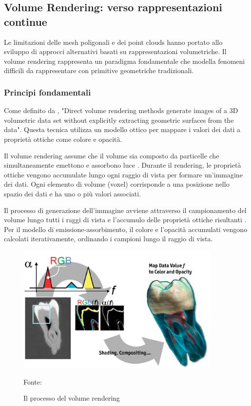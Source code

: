 \subsection{Volume Rendering: verso rappresentazioni continue}

Le limitazioni delle mesh poligonali e dei point clouds hanno portato allo sviluppo di approcci alternativi basati su rappresentazioni volumetriche. Il volume rendering rappresenta un paradigma fondamentale che modella fenomeni difficili da rappresentare con primitive geometriche tradizionali.

\subsubsection{Principi fondamentali}

Come definito da \cite{ikits2004volume}, "Direct volume rendering methods generate images of a 3D volumetric data set without explicitly extracting geometric surfaces from the data". Questa tecnica utilizza un modello ottico per mappare i valori dei dati a proprietà ottiche come colore e opacità.

Il volume rendering assume che il volume sia composto da particelle che simultaneamente emettono e assorbono luce \cite{ikits2004volume}. Durante il rendering, le proprietà ottiche vengono accumulate lungo ogni raggio di vista per formare un'immagine dei dati. Ogni elemento di volume (voxel) corrisponde a una posizione nello spazio dei dati e ha uno o più valori associati.

Il processo di generazione dell'immagine avviene attraverso il campionamento del volume lungo tutti i raggi di vista e l'accumulo delle proprietà ottiche risultanti \cite{ikits2004volume}. Per il modello di emissione-assorbimento, il colore e l'opacità accumulati vengono calcolati iterativamente, ordinando i campioni lungo il raggio di vista.

\begin{figure}[htbp]
    \centering
    \includegraphics[width=0.9\textwidth]{images/volume_rendering_process.jpg}
    \caption{Il processo del volume rendering}
    Fonte: \cite{volume_rendering_process}
\end{figure}

